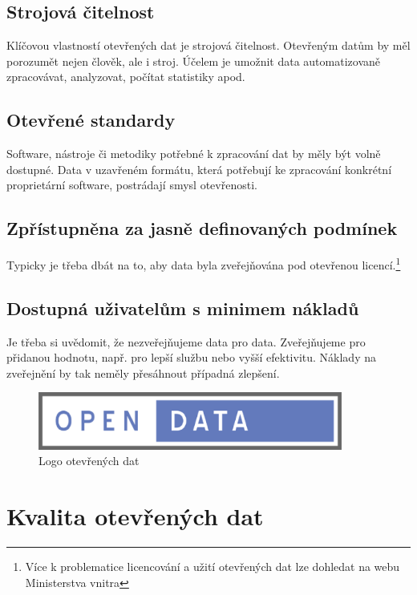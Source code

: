 \subsection*{Strojová čitelnost}

Klíčovou vlastností otevřených dat je strojová čitelnost. Otevřeným datům by měl porozumět nejen člověk, ale i stroj. Účelem je umožnit data automatizovaně zpracovávat, analyzovat, počítat statistiky apod.

\subsection*{Otevřené standardy}

Software, nástroje či metodiky potřebné k zpracování dat by měly být volně dostupné. Data v uzavřeném formátu, která potřebují ke zpracování konkrétní proprietární software, postrádají smysl otevřenosti.

\subsection*{Zpřístupněna za jasně definovaných podmínek}

Typicky je třeba dbát na to, aby data byla zveřejňována pod otevřenou licencí.\footnote{Více k problematice licencování a užití otevřených dat lze dohledat na webu Ministerstva vnitra\cite{mv}}

\subsection*{Dostupná uživatelům s minimem nákladů}

Je třeba si uvědomit, že nezveřejňujeme data pro data. Zveřejňujeme pro přidanou hodnotu, např. pro lepší službu nebo vyšší efektivitu. Náklady na zveřejnění by tak neměly přesáhnout případná zlepšení.
\newline

\begin{figure}[h]
\centerline{\includegraphics[width=100mm]{img/opendata.eps}}
\caption{Logo otevřených dat}
\label{modules}
\end{figure}

\newpage

\section{Kvalita otevřených dat}

